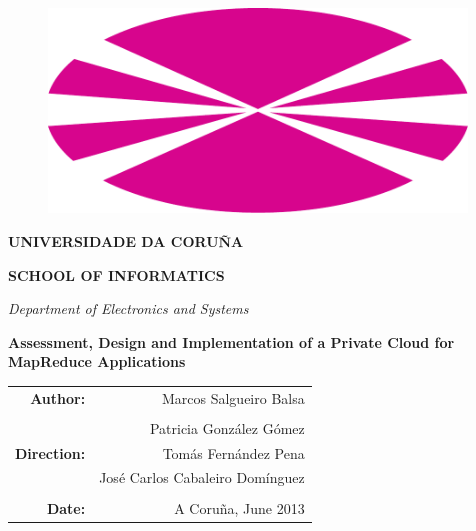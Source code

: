 \begin{titlepage}
\begin{changemargin}{-2.8cm}{0cm}
\begin{center}

\begin{figure}[tbp]
\hspace*{-1.5cm}
\includegraphics[width=0.99\textwidth]{imagenes/00.pdf}
\end{figure}

{\Large \bf{UNIVERSIDADE DA CORU\~NA}}

{\large \bf{SCHOOL OF INFORMATICS}}

\vspace{0.25cm}

\emph{Department of Electronics and Systems}

\vspace{1.25cm}



{\huge \bf{Assessment, Design and Implementation of a Private Cloud for MapReduce Applications}}

\vspace{1.5cm}

\begin{flushright}
\begin{tabular}{r r@{}}
\textbf{Author:} & Marcos Salgueiro Balsa \\
& \\
& Patricia Gonz\'alez G\'omez \\
\textbf{Direction:} & Tom\'as Fern\'andez Pena \\
& Jos\'e Carlos Cabaleiro Dom\'inguez \\
& \\
\textbf{Date:} & A Coru\~na, June 2013
\end{tabular}
\end{flushright}

\end{center}
\end{changemargin}
\end{titlepage}
